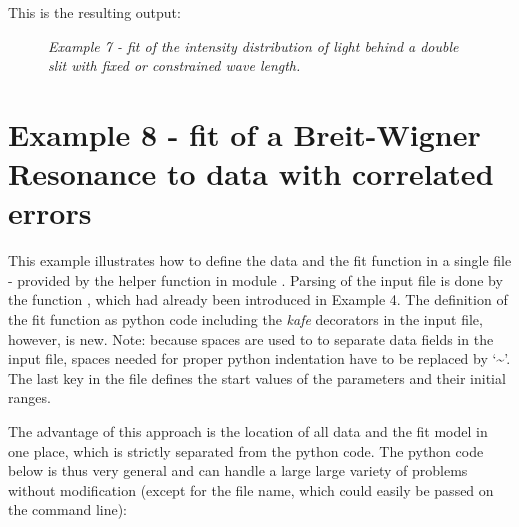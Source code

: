 \documentclass[a4paper,10pt,english]{sphinxmanual}
\begin{document}
This is the resulting output:
\begin{figure}[htbp]
\centering
\capstart

\caption{\emph{Example 7 - fit of the intensity distribution of light behind a double slit with fixed or constrained wave length.}}\end{figure}


\section{Example 8 - fit of a Breit-Wigner Resonance to data with correlated errors}
\label{index:example-8-fit-of-a-breit-wigner-resonance-to-data-with-correlated-errors}
This example illustrates how to define the data and the fit function
in a single file - provided by the helper function 
in module . Parsing of the input file is done by the
function , which had already been introduced
in Example 4. The definition of the fit function as python code
including the \emph{kafe} decorators in the input file, however, is new.
Note: because spaces are used to to separate data  fields in the
input file, spaces needed for proper python indentation have to be
replaced by `\textasciitilde{}'. The last key in the file defines the start values
of the parameters and their initial ranges.

The advantage of this approach is the location of all data
and the fit model in one place, which is strictly separated
from the python code. The python code below is thus very general
and can handle a large large variety of problems without
modification (except for the file name, which could easily be
passed on the command line):
\end{document}
